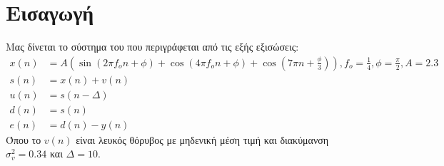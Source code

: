 \newcommand{\weiner}[1]{\mathbf{w}\left(#1\right)}
\newcommand{\wienero}{\mathbf{w_o}}
\newcommand{\Rmatrix}{\mathbf{R}}
\newcommand{\Pvector}{\mathbf{p}}
\section{Εισαγωγή}
Μας δίνεται το σύστημα του 
που περιγράφεται από τις εξής εξισώσεις:
\begin{align}
x(n) &= A\left(\sin\left(2 \pi f_o n + \phi\right) + \cos\left(4 \pi f_o n + \phi\right) + \cos\left(7 \pi n + \frac{\phi}{3} \right)\right), f_o=\frac{1}{4}, \phi=\frac{\pi}{2}, A=2.3\label{eq:x}\\
s(n) &= x(n) + v(n)\label{eq:s}\\
u(n) &= s(n - \Delta)\label{eq:u}\\
d(n) &= s(n)\\
e(n) &= d(n) - y(n)\label{eq:e}
\end{align}
Όπου το $v(n)$ είναι λευκός θόρυβος με μηδενική μέση τιμή και διακύμανση $\sigma_{v}^2 = 0.34$
και $\Delta = 10$.
